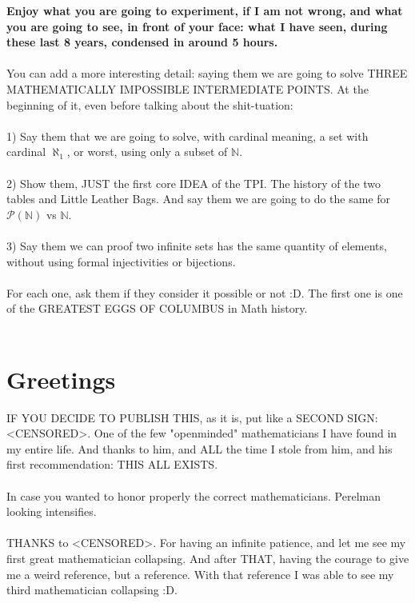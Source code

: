 		\noindent
		\textbf{Enjoy what you are going to experiment, if I am not wrong, and what you are going to see, in front of your face: what I have seen, during these last 8 years, condensed in around 5 hours.}
		\\\\
		
		\noindent
		You can add a more interesting detail: saying them we are going to solve THREE MATHEMATICALLY IMPOSSIBLE INTERMEDIATE POINTS. At the beginning of it, even before talking about the shit-tuation:\\\\
		1) Say them that we are going to solve, with cardinal meaning, a set with cardinal $\aleph_{1}$, or worst, using only a subset of $\mathbb{N}$.\\\\
		2) Show them, JUST the first core IDEA of the TPI. The history of the two tables and Little Leather Bags. And say them we are going to do the same for $\mathcal{P}(\mathbb{N})$ vs $\mathbb{N}$.\\\\
		3) Say them we can proof two infinite sets has the same quantity of elements, without using formal injectivities or bijections.
		\\\\
		
		\noindent
		For each one, ask them if they consider it possible or not :D. The first one is one of the GREATEST EGGS OF COLUMBUS in Math history.
		\\\\
		
	\section{Greetings}
	
		\noindent
		IF YOU DECIDE TO PUBLISH THIS, as it is, put like a SECOND SIGN: <CENSORED>. One of the few "openminded" mathematicians I have found in my entire life. And thanks to him, and ALL the time I stole from him, and his first recommendation: THIS ALL EXISTS.
		\\\\
		
		\noindent
		In case you wanted to honor properly the correct mathematicians. Perelman looking intensifies.
		\\\\
		
		\noindent
		THANKS to <CENSORED>. For having an infinite patience, and let me see my first great mathematician collapsing. And after THAT, having the courage to give me a weird reference, but a reference. With that reference I was able to see my third mathematician collapsing :D.
		\\\\
		
